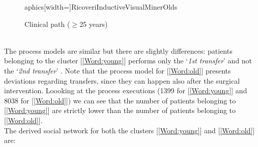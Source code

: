 \begin{figure} [htbp]
aphics[width=\textwidth]{RicoveriInductiveVisualMinerOlds}
\caption{Clinical path ($\geq$25 years)}
\end{figure}\\
The process models are similar but there are slightly differences: patients belonging to the cluster [\ref{Word:young}] performs only the `\textit{1st transfer}' and not the `\textit{2nd transfer}'                                                                                                                                                                                                                                                                                                                                                                                                                                                                                                                                                                 . Note that the process model for [\ref{Word:old}] presents deviations regarding transfers, since they can happen also after the surgical intervention. Loooking at the process executions (1399 for [\ref{Word:young}] and 8038 for [\ref{Word:old}]) we can see that the number of patients belonging to [\ref{Word:young}] are strictly lower than the number of patients belonging to [\ref{Word:old}].\\
The derived social network for both the clusters [\ref{Word:young}] and [\ref{Word:old}] are:
